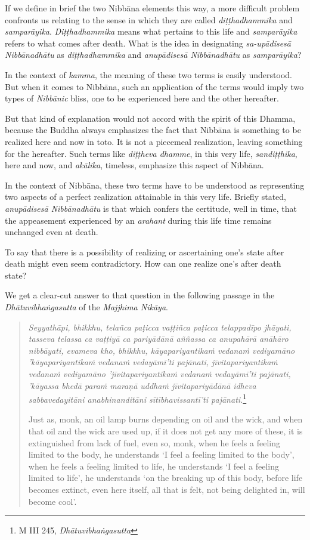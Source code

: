If we define in brief the two Nibbāna elements this way, a more difficult problem confronts us relating to the sense in which they are called \emph{diṭṭhadhammika} and \emph{samparāyika}. \emph{Diṭṭhadhammika} means what pertains to this life and \emph{samparāyika} refers to what comes after death. What is the idea in designating \emph{sa-upādisesā Nibbānadhātu} as \emph{diṭṭhadhammika} and \emph{anupādisesā Nibbānadhātu} as \emph{samparāyika}?

In the context of \emph{kamma}, the meaning of these two terms is easily understood. But when it comes to Nibbāna, such an application of the terms would imply two types of \emph{Nibbānic} bliss, one to be experienced here and the other hereafter.

But that kind of explanation would not accord with the spirit of this Dhamma, because the Buddha always emphasizes the fact that Nibbāna is something to be realized here and now in toto. It is not a piecemeal realization, leaving something for the hereafter. Such terms like \emph{diṭṭheva dhamme}, in this very life, \emph{sandiṭṭhika}, here and now, and \emph{akālika}, timeless, emphasize this aspect of Nibbāna.

In the context of Nibbāna, these two terms have to be understood as representing two aspects of a perfect realization attainable in this very life. Briefly stated, \emph{anupādisesā Nibbānadhātu} is that which confers the certitude, well in time, that the appeasement experienced by an \emph{arahant} during this life time remains unchanged even at death.

To say that there is a possibility of realizing or ascertaining one's state after death might even seem contradictory. How can one realize one's after death state?

We get a clear-cut answer to that question in the following passage in the \emph{Dhātuvibhaṅgasutta} of the \emph{Majjhima Nikāya}.

\begin{quote}
\emph{Seyyathāpi, bhikkhu, telañca paṭicca vaṭṭiñca paṭicca telappadīpo jhāyati, tasseva telassa ca vaṭṭiyā ca pariyādānā aññassa ca anupahārā anāhāro nibbāyati, evameva kho, bhikkhu, kāyapariyantikaṁ vedanaṁ vediyamāno 'kāyapariyantikaṁ vedanaṁ vedayāmī'ti pajānati, jīvitapariyantikaṁ vedanaṁ vediyamāno 'jīvitapariyantikaṁ vedanaṁ vedayāmī'ti pajānati, 'kāyassa bhedā paraṁ maraṇā uddhaṁ jīvitapariyādānā idheva sabbavedayitāni anabhinanditāni sītībhavissantī'ti pajānati.}\footnote{M III 245, \emph{Dhātuvibhaṅgasutta}}

Just as, monk, an oil lamp burns depending on oil and the wick, and when that oil and the wick are used up, if it does not get any more of these, it is extinguished from lack of fuel, even so, monk, when he feels a feeling limited to the body, he understands `I feel a feeling limited to the body', when he feels a feeling limited to life, he understands `I feel a feeling limited to life', he understands `on the breaking up of this body, before life becomes extinct, even here itself, all that is felt, not being delighted in, will become cool'.
\end{quote}

